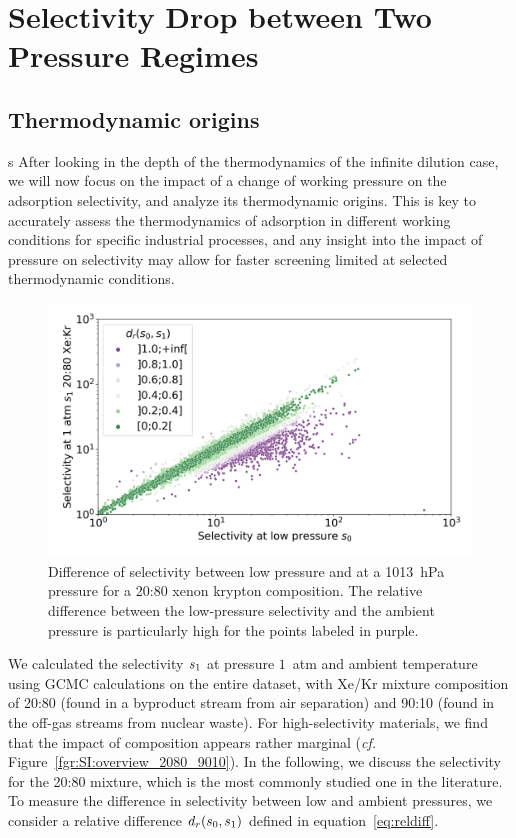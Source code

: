 \documentclass[main.tex]{subfiles}
\begin{document}

\section{Selectivity Drop between Two Pressure Regimes}

\subsection{Thermodynamic origins}\label{section:pressure}
s
After looking in the depth of the thermodynamics of the infinite dilution case, we will now focus on the impact of a change of working pressure on the adsorption selectivity, and analyze its thermodynamic origins. This is key to accurately assess the thermodynamics of adsorption in different working conditions for specific industrial processes, and any insight into the impact of pressure on selectivity may allow for faster screening limited at selected thermodynamic conditions.

\begin{figure}[ht]
  \centering
    \includegraphics[width=0.6\linewidth]{figures/2-thermo/s_0_vs_s_2080_overview_log.jpg}
    \caption{Difference of selectivity between low pressure and at a \SI{1013}{\hecto\pascal} pressure for a 20:80 xenon krypton composition. The relative difference between the low-pressure selectivity and the ambient pressure is particularly high for the points labeled in purple.}\label{fgr:overview}
\end{figure}

We calculated the selectivity $s_{\text{1}}$ at pressure $1$~atm and ambient temperature using GCMC calculations on the entire dataset, with Xe/Kr mixture composition of 20:80 (found in a byproduct stream from air separation\autocite{kerry2007industrial}) and 90:10 (found in the off-gas streams from nuclear waste\autocite{auerbach2003handbook}). For high-selectivity materials, we find that the impact of composition appears rather marginal (\emph{cf.} Figure~\ref{fgr:SI:overview_2080_9010}). In the following, we discuss the selectivity for the 20:80 mixture, which is the most commonly studied one in the literature. To measure the difference in selectivity between low and ambient pressures, we consider a relative difference $d_r(s_{\text{0}},s_{\text{1}})$ defined in equation~\ref{eq:reldiff}.
\end{document}
